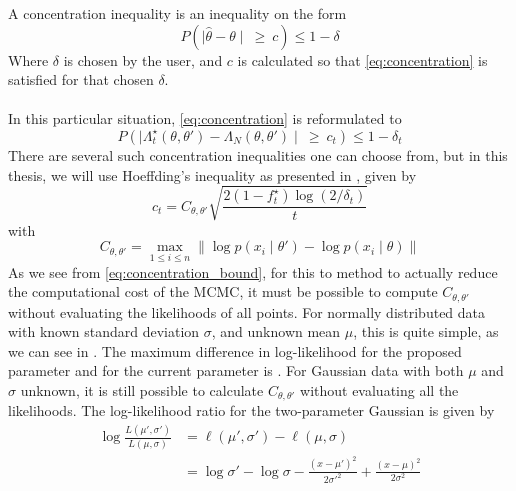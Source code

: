 A concentration inequality is an inequality on the form 
\begin{equation}\label{eq:concentration}
    P\left(\mid \hat{\theta} - \theta \mid \:\geq \:c\right) \leq 1 - \delta 
\end{equation}
Where $\delta$ is chosen by the user, and $c$ is calculated so that \eqref{eq:concentration} is satisfied for that chosen $\delta$.   \\ \\ 
In this particular situation, \eqref{eq:concentration} is reformulated to 
\begin{equation*}
    P\left(\mid\Lambda_t^{\star}\left(\theta, \theta'\right) - \Lambda_N\left(\theta, \theta'\right)\mid \: \geq \:c_t \right) \leq 1 - \delta_t  
\end{equation*}{}
There are several such concentration inequalities one can choose from, but in this thesis, we will use Hoeffding's inequality as presented in \cite{Bardenet:2}, given by 
\begin{equation}\label{eq:Hoeffding}
    c_t = C_{\theta, \theta'}\sqrt{\frac{2\left(1 - f_t^{\star}\right)\log\left(2/\delta_t\right)}{t}}
\end{equation}
with 
\begin{equation}\label{eq:concentration_bound}
    C_{\theta, \theta'} = \max_{1\leq i \leq n} \lVert \log p\left(x_i \mid \theta'\right) - \log p\left(x_i\mid\theta\right)\rVert
\end{equation}
As we see from \eqref{eq:concentration_bound}, for this to method to actually reduce the computational cost of the MCMC, it must be possible to compute $C_{\theta, \theta'}$ without evaluating the likelihoods of all points. For normally distributed data with known standard deviation $\sigma$, and unknown mean $\mu$, this is quite simple, as we can see in \cite{Bardenet:2}. The maximum difference in log-likelihood for the proposed parameter and for the current parameter is . For Gaussian data with both $\mu$ and $\sigma$ unknown, it is still possible to calculate $C_{\theta, \theta'}$ without evaluating all the likelihoods. The log-likelihood ratio for the two-parameter Gaussian is given by
\begin{equation}\label{eq:loglik_diff}
\begin{split}
    \log \frac{L\left(\mu', \sigma'\right)}{L\left(\mu, \sigma\right)} &= \ell\left(\mu', \sigma'\right) - \ell\left(\mu, \sigma\right) \\
    & = \log \sigma' - \log \sigma - \frac{\left(x - \mu'\right)^2}{2\sigma'^2} + \frac{\left(x - \mu\right)^2}{2\sigma^2} \\
\end{split}
\end{equation}{}
